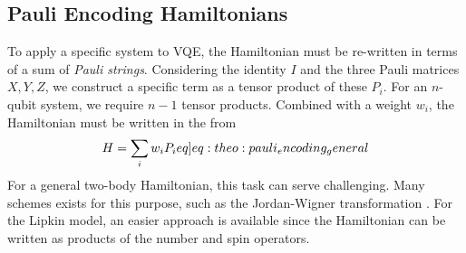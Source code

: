 \subsection{Pauli Encoding Hamiltonians}
To apply a specific system to VQE, the Hamiltonian must be re-written in terms of a sum of \textit{Pauli strings}. Considering the identity $I$ and the three Pauli matrices $X, Y, Z$, we construct a specific term as a tensor product of these $P_i$. For an $n$-qubit system, we require $n-1$ tensor products. Combined with a weight $w_i$, the Hamiltonian must be written in the from
\begin{align}
    H = \sum_i w_i P_i \label[eq]{eq:theo:pauli_encoding_general}
\end{align}
For a general two-body Hamiltonian, this task can serve challenging. Many schemes exists for this purpose, such as the Jordan-Wigner transformation \citep{steudtnerMethodsSimulateFermions2019}. For the Lipkin model, an easier approach is available since the Hamiltonian can be written as products of the number and spin operators.
